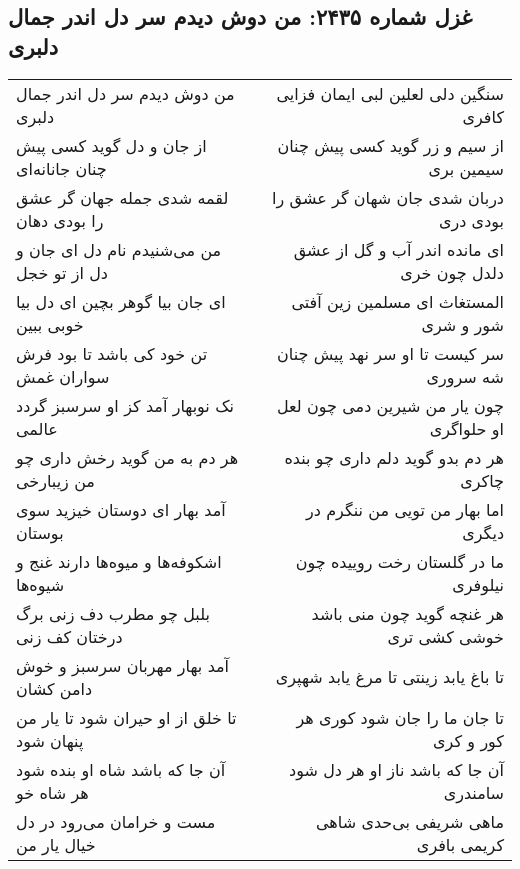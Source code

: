 \begin{center}
\section*{غزل شماره ۲۴۳۵: من دوش دیدم سر دل اندر جمال دلبری}
\label{sec:2435}
\begin{longtable}{l p{0.5cm} r}
من دوش دیدم سر دل اندر جمال دلبری
&&
سنگین دلی لعلین لبی ایمان فزایی کافری
\\
از جان و دل گوید کسی پیش چنان جانانه‌ای
&&
از سیم و زر گوید کسی پیش چنان سیمین بری
\\
لقمه شدی جمله جهان گر عشق را بودی دهان
&&
دربان شدی جان شهان گر عشق را بودی دری
\\
من می‌شنیدم نام دل ای جان و دل از تو خجل
&&
ای مانده اندر آب و گل از عشق دلدل چون خری
\\
ای جان بیا گوهر بچین ای دل بیا خوبی ببین
&&
المستغاث ای مسلمین زین آفتی شور و شری
\\
تن خود کی باشد تا بود فرش سواران غمش
&&
سر کیست تا او سر نهد پیش چنان شه سروری
\\
نک نوبهار آمد کز او سرسبز گردد عالمی
&&
چون یار من شیرین دمی چون لعل او حلواگری
\\
هر دم به من گوید رخش داری چو من زیبارخی
&&
هر دم بدو گوید دلم داری چو بنده چاکری
\\
آمد بهار ای دوستان خیزید سوی بوستان
&&
اما بهار من تویی من ننگرم در دیگری
\\
اشکوفه‌ها و میوه‌ها دارند غنج و شیوه‌ها
&&
ما در گلستان رخت روییده چون نیلوفری
\\
بلبل چو مطرب دف زنی برگ درختان کف زنی
&&
هر غنچه گوید چون منی باشد خوشی کشی تری
\\
آمد بهار مهربان سرسبز و خوش دامن کشان
&&
تا باغ یابد زینتی تا مرغ یابد شهپری
\\
تا خلق از او حیران شود تا یار من پنهان شود
&&
تا جان ما را جان شود کوری هر کور و کری
\\
آن جا که باشد شاه او بنده شود هر شاه خو
&&
آن جا که باشد ناز او هر دل شود سامندری
\\
مست و خرامان می‌رود در دل خیال یار من
&&
ماهی شریفی بی‌حدی شاهی کریمی بافری
\\
\end{longtable}
\end{center}

